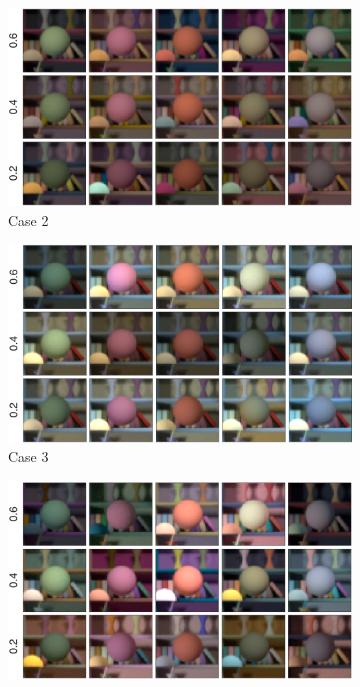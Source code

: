 \documentclass{jov}
\begin{document}
\begin{figure}
\centering
	\begin{subfigure}[b]{0.33 \textwidth}
		\includegraphics[width=\textwidth]{../Figures/Figure2/Figure2_a.png}
		\caption{Case 2}
 		\label{fig:backgroundVarying}
	\end{subfigure}
	\begin{subfigure}[b]{0.33 \textwidth}
        \includegraphics[width=\textwidth]{../Figures/Figure2/Figure2_b.png}
        \caption{Case 3}
        \label{fig:targetIlluminantVarying}
    \end{subfigure}
	\begin{subfigure}[b]{0.33 \textwidth}
        \includegraphics[width=\textwidth]{../Figures/Figure2/Figure2_c.png}

\end{subfigure}
\end{figure}
\end{document}
